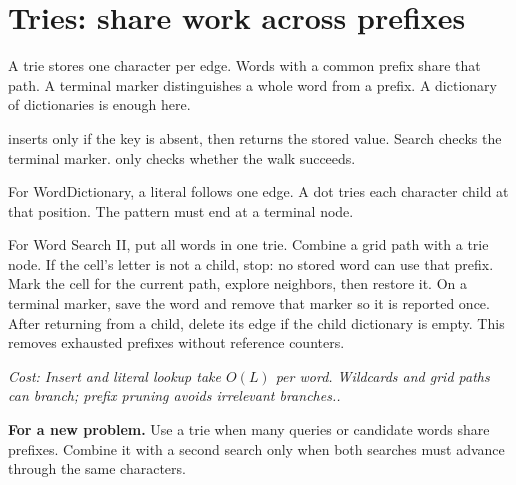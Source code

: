 \documentclass[11pt]{article}
\newcommand{\cd}[1]{{\frenchspacing\texttt{\detokenize{#1}}}}
\newcommand{\transfer}[1]{\par\textbf{For a new problem.} #1\par}
\newcommand{\cost}[1]{\par\textit{Cost: #1.}\par}
\begin{document}
\section{Tries: share work across prefixes}\label{sec:trie}
A trie stores one character per edge. Words with a common prefix share that path.
A terminal marker distinguishes a whole word from a prefix. A dictionary of dictionaries is enough here.
\par\noindent\begin{minipage}{\linewidth}
\hypertarget{example-start-33}{}
\hypertarget{example-end-33}{}
\end{minipage}\par
\cd{setdefault(key, value)} inserts \cd{value} only if the key is absent, then returns the stored value.
Search checks the terminal marker. \cd{startsWith} only checks whether the walk succeeds.

For WordDictionary, a literal follows one edge. A dot tries each character child at that position.
The pattern must end at a terminal node.
\par\noindent\begin{minipage}{\linewidth}
\hypertarget{example-start-34}{}
\hypertarget{example-end-34}{}
\end{minipage}\par
For Word Search II, put all words in one trie. Combine a grid path with a trie node.
If the cell's letter is not a child, stop: no stored word can use that prefix.
Mark the cell for the current path, explore neighbors, then restore it.
On a terminal marker, save the word and remove that marker so it is reported once.
After returning from a child, delete its edge if the child dictionary is empty.
This removes exhausted prefixes without reference counters.
\cost{Insert and literal lookup take \(O(L)\) per word. Wildcards and grid paths can branch; prefix pruning avoids irrelevant branches.}
\transfer{Use a trie when many queries or candidate words share prefixes.
Combine it with a second search only when both searches must advance through the same characters.}
\end{document}
